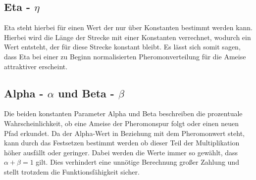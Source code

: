 {	\subsection{Eta - $\eta$}
	Eta steht hierbei für einen Wert der nur über Konstanten bestimmt werden kann. Hierbei wird die Länge der Strecke mit einer Konstanten verrechnet, wodurch ein Wert entsteht, der für diese Strecke konstant bleibt. Es lässt sich somit sagen, dass Eta bei einer zu Beginn normalisierten Pheromonverteilung für die Ameise attraktiver erscheint.
	
	\subsection{Alpha - $\alpha$ und Beta - $\beta$}
	Die beiden konstanten Parameter Alpha und Beta beschreiben die prozentuale Wahrscheinlichkeit, ob eine Ameise der Pheromonspur folgt oder einen neuen Pfad erkundet. Da der Alpha-Wert in Beziehung mit dem Pheromonwert steht, kann durch das Festsetzen bestimmt werden ob dieser Teil der Multiplikation höher ausfällt oder geringer. Dabei werden die Werte immer so gewählt, dass $\alpha + \beta = 1$ gilt. Dies verhindert eine unnötige Berechnung großer Zahlung und stellt trotzdem die Funktionsfähigkeit sicher.
}